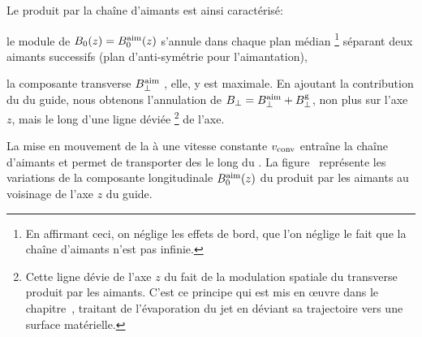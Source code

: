 \noindent Le \chm produit par la chaîne d'aimants est ainsi caractérisé:%
\begin{itemizel}
	\item le module de ${B_0}(z) = {B_{0}^{\rm aim}}(z)$ %
	s'annule dans chaque plan médian%
	\footnote{En affirmant ceci, on néglige les effets de bord, \cad que l'on néglige le fait que la chaîne d'aimants n'est pas infinie.} %
	séparant deux aimants successifs (plan d'anti-symétrie pour l'aimantation),
	\item la composante transverse ${B_{\rm \bot}^{\rm aim}}$%
	, elle, y est maximale. En ajoutant la contribution du \gtchm du guide, nous obtenons l'annulation de ${B_{\rm \bot}} = {B_{\rm \bot}^{\rm aim}} + {B_{\rm \bot}^{\rm g}}$, non plus sur l'axe $z$, mais le long d'une ligne déviée %
	\footnote{Cette ligne dévie de l'axe $z$ du fait de la modulation spatiale du \chm transverse produit par les aimants. C'est ce principe qui est mis en \oe uvre dans le chapitre~, traitant de l'évaporation du jet en déviant sa trajectoire vers une surface matérielle.}
%
de l'axe.
\end{itemizel} 
%
%
La mise en mouvement de la \couconv à une vitesse constante ${v_{\rm conv}}$ %
%
entraîne la chaîne d'aimants et permet de transporter des \pats le long du \gm. 
La figure~ représente les variations de la composante longitudinale ${B_{0}^{\rm aim}}(z)$ du \chm produit par les aimants au voisinage de l'axe $z$ du guide.
\bfigh
{}\\
\label{fig:ConvAnimQPChampLong}
\efigh


